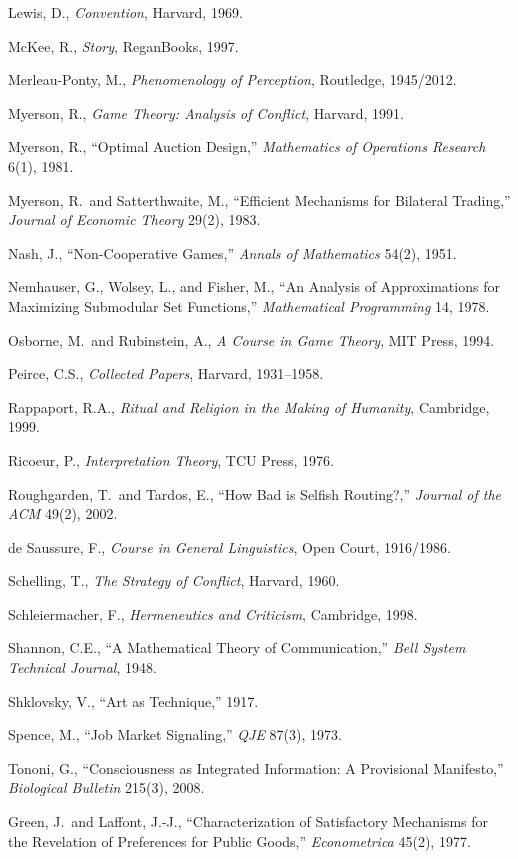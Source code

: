 \documentclass[11pt,oneside]{book}
\theoremstyle{plain}
\theoremstyle{definition}
\theoremstyle{remark}
\begin{document}
\begin{enumerate}[label={[\arabic*]}]
\item Lewis, D., \emph{Convention}, Harvard, 1969.
\item McKee, R., \emph{Story}, ReganBooks, 1997.
\item Merleau-Ponty, M., \emph{Phenomenology of Perception}, Routledge, 1945/2012.
\item Myerson, R., \emph{Game Theory: Analysis of Conflict}, Harvard, 1991.
\item Myerson, R., ``Optimal Auction Design,'' \emph{Mathematics of Operations Research} 6(1), 1981.
\item Myerson, R.\ and Satterthwaite, M., ``Efficient Mechanisms for Bilateral Trading,'' \emph{Journal of Economic Theory} 29(2), 1983.
\item Nash, J., ``Non-Cooperative Games,'' \emph{Annals of Mathematics} 54(2), 1951.
\item Nemhauser, G., Wolsey, L., and Fisher, M., ``An Analysis of Approximations for Maximizing Submodular Set Functions,'' \emph{Mathematical Programming} 14, 1978.
\item Osborne, M.\ and Rubinstein, A., \emph{A Course in Game Theory}, MIT Press, 1994.
\item Peirce, C.S., \emph{Collected Papers}, Harvard, 1931--1958.
\item Rappaport, R.A., \emph{Ritual and Religion in the Making of Humanity}, Cambridge, 1999.
\item Ricoeur, P., \emph{Interpretation Theory}, TCU Press, 1976.
\item Roughgarden, T.\ and Tardos, E., ``How Bad is Selfish Routing?,'' \emph{Journal of the ACM} 49(2), 2002.
\item de Saussure, F., \emph{Course in General Linguistics}, Open Court, 1916/1986.
\item Schelling, T., \emph{The Strategy of Conflict}, Harvard, 1960.
\item Schleiermacher, F., \emph{Hermeneutics and Criticism}, Cambridge, 1998.
\item Shannon, C.E., ``A Mathematical Theory of Communication,'' \emph{Bell System Technical Journal}, 1948.
\item Shklovsky, V., ``Art as Technique,'' 1917.
\item Spence, M., ``Job Market Signaling,'' \emph{QJE} 87(3), 1973.
\item Tononi, G., ``Consciousness as Integrated Information: A Provisional Manifesto,'' \emph{Biological Bulletin} 215(3), 2008.
\item Green, J.\ and Laffont, J.-J., ``Characterization of Satisfactory Mechanisms for the Revelation of Preferences for Public Goods,'' \emph{Econometrica} 45(2), 1977.

\end{enumerate}
\end{document}
